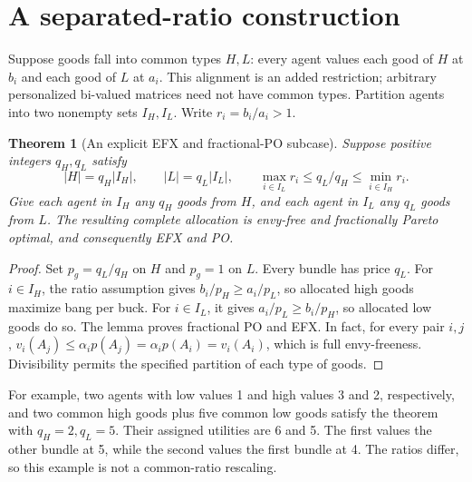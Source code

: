 \documentclass[11pt,a4paper]{article}
\newtheorem{theorem}{Theorem}[section]
\theoremstyle{definition}
\theoremstyle{remark}
\begin{document}
\section{A separated-ratio construction}
Suppose goods fall into common types $H,L$: every agent values each good of $H$ at $b_i$ and each good of $L$ at $a_i$. This alignment is an added restriction; arbitrary personalized bi-valued matrices need not have common types. Partition agents into two nonempty sets $I_H,I_L$. Write $r_i=b_i/a_i>1$.
\begin{theorem}[An explicit EFX and fractional-PO subcase]
Suppose positive integers $q_H,q_L$ satisfy
\[
 |H|=q_H|I_H|,\qquad |L|=q_L|I_L|,\qquad
 \max_{i\in I_L}r_i\le q_L/q_H\le\min_{i\in I_H}r_i.
\]
Give each agent in $I_H$ any $q_H$ goods from $H$, and each agent in $I_L$ any $q_L$ goods from $L$. The resulting complete allocation is envy-free and fractionally Pareto optimal, and consequently EFX and PO.
\end{theorem}
\begin{proof}
Set $p_g=q_L/q_H$ on $H$ and $p_g=1$ on $L$. Every bundle has price $q_L$. For $i\in I_H$, the ratio assumption gives $b_i/p_H\ge a_i/p_L$, so allocated high goods maximize bang per buck. For $i\in I_L$, it gives $a_i/p_L\ge b_i/p_H$, so allocated low goods do so. The lemma proves fractional PO and EFX. In fact, for every pair $i,j$,
$v_i(A_j)\le\alpha_i p(A_j)=\alpha_i p(A_i)=v_i(A_i)$,
which is full envy-freeness. Divisibility permits the specified partition of each type of goods.
\end{proof}
For example, two agents with low values 1 and high values 3 and 2, respectively, and two common high goods plus five common low goods satisfy the theorem with $q_H=2,q_L=5$. Their assigned utilities are 6 and 5. The first values the other bundle at 5, while the second values the first bundle at 4. The ratios differ, so this example is not a common-ratio rescaling.
\end{document}
